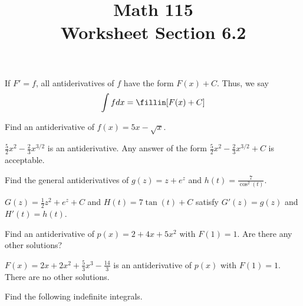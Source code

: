 \documentclass[11pt]{exam}
\title{\vspace{-0.5in} Math 115 \\ Worksheet Section 6.2}
\date{}
\begin{document}
\maketitle
\vspace{-0.75in}
If $F'=f$, all antiderivatives of $f$ have the form $F(x)+C$. Thus, we
say \[
  \int f dx = \fillin[F(x) + C]
\]
\begin{questions}
  \question Find an antiderivative of $f(x)=5x-\sqrt{x}$.
    \begin{solution}
      \(\frac{5}{2} x^2 - \frac{2}{3} x^{3/2}\) is an
      antiderivative. Any answer of the form \(\frac{5}{2} x^2 -
      \frac{2}{3} x^{3/2} + C\) is acceptable.
    \end{solution}
  \question Find the general antiderivatives of $g(z)=z+e^z$ and $h(t) = \displaystyle\frac{7}{\cos^2(t)}$.
    \begin{solution}
      \(G(z) = \frac{1}{2} z^2 + e^z + C\) and \(H(t) = 7\tan(t) + C\)
      satisfy \(G'(z) = g(z)\) and \(H'(t) = h(t)\).
    \end{solution}
  \question Find an antiderivative of $p(x)=2+4x+5x^2$ with $F(1)=1$.  Are there any other solutions?
    \begin{solution}
      \(F(x) = 2x + 2x^2 + \frac{5}{3} x^3 - \frac{14}{3} \) is an
      antiderivative of \(p(x)\) with \(F(1) = 1\). There are no other solutions.
    \end{solution}
  \question Find the following indefinite integrals.
\end{questions}
\end{document}
